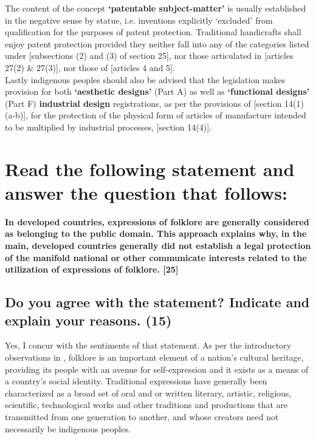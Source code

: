 \documentclass[11pt]{article}
\begin{document}
The content of the concept \textbf{`patentable subject-matter'} is usually established
in the negative sense by statue, i.e. inventions explicitly `excluded' from
qualification for the purposes of patent protection. Traditional handicrafts
shall enjoy patent protection provided they neither fall  into any of the
categories listed under [subsections (2) and (3) of section
25]\cite{rsa78_patents_act}, nor those articulated in [articles 27(2) \&
27(3)]\cite{wto17_trips}, nor those of [articles 4 and
5]\cite{wipo83_paris_conve_protect_ip}.\\

Lastly indigenous peoples should also be advised that the legislation makes
provision for both \textbf{`aesthetic designs'} (Part A) as well as \textbf{`functional
designs'} (Part F) \textbf{industrial design} registrations, as per the provisions of
[section 14(1)(a-b)]\cite{rsa93_designs_act}, for the protection of the physical
form of articles of manufacture intended to be multiplied by industrial
processes, [section 14(4)]\cite{rsa93_designs_act}.

\section{Read the following statement and answer the question that follows:}
\label{sec:org7a5b99c}

\textbf{In developed countries, expressions of folklore are generally considered as belonging to the public domain. This approach explains why, in the main, developed countries generally did not establish a legal protection of the manifold national or other communicate interests related to the utilization of expressions of folklore. [25]}

\subsection{Do you agree with the statement? Indicate and explain your reasons. (15)}
\label{sec:orgf06c1c4}

Yes, I concur with the sentiments of that statement. As per the introductory
observations in \cite{wipo85_model_provi_national_laws_folklore}, folklore is an
important element of a nation's cultural heritage, providing its people with an
avenue for self-expression and it exists as a means of a country's social
identity. Traditional expressions have generally been characterized as a broad
set of oral and or written literary, artistic, religious, scientific,
technological works and other traditions and productions that are transmitted
from one generation to another, and whose creators need not necessarily be
indigenous peoples.\\
\end{document}
